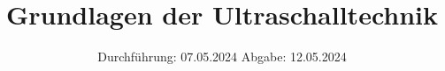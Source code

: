 

\subject{US1}
\title{Grundlagen der Ultraschalltechnik}
\date{%
  Durchführung: 07.05.2024
  \hspace{3em}
  Abgabe: 12.05.2024
}



\maketitle
\thispagestyle{empty}
\tableofcontents
\newpage






\printbibliography{}

